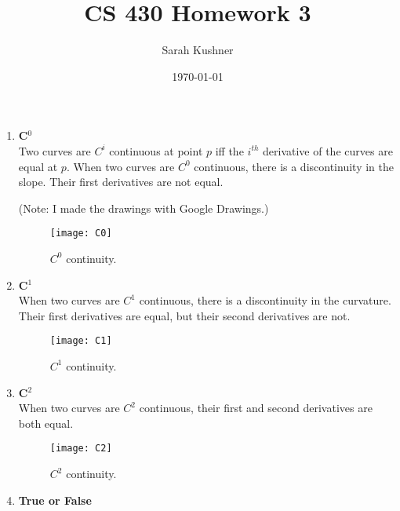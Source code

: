\documentclass[12pt]{article}
\begin{document}
\title{CS 430 Homework 3}
\author{Sarah Kushner}
\date{\today}
\maketitle

\begin{enumerate}

\item 
\textbf{C$^0$} \\
Two curves are $C^i$ continuous at point $p$ iff the $i^{th}$ derivative of the curves are equal at $p$.
When two curves are $C^0$ continuous, there is a discontinuity in the slope. Their first derivatives are not equal.

(Note: I made the drawings with Google Drawings.) \\
\begin{figure}[H]
    \centering
	\texttt{[image: C0]}
    \caption{$C^0$ continuity.}
\end{figure}

\item 
\textbf{C$^1$} \\
When two curves are $C^1$ continuous, there is a discontinuity in the curvature. Their first derivatives are equal, but their second derivatives are not.

\begin{figure}[H]
    \centering
	\texttt{[image: C1]}
    \caption{$C^1$ continuity.}
\end{figure}

\item 
\textbf{C$^2$} \\
When two curves are $C^2$ continuous, their first and second derivatives are both equal.

\begin{figure}[H]
    \centering
	\texttt{[image: C2]}
    \caption{$C^2$ continuity.}
\end{figure}

\item
\textbf{True or False} \\
\end{enumerate}
\end{document}

